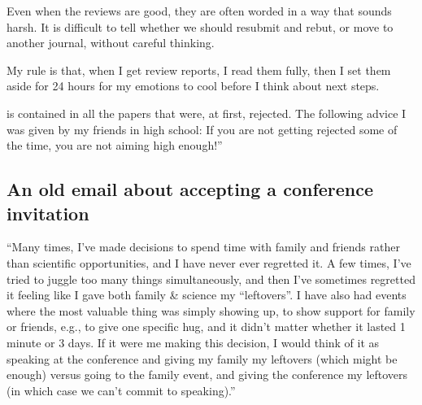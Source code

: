 \documentclass[letterpaper,10pt,english]{sphinxmanual}
\begin{document}
\sphinxAtStartPar
Even when the reviews are good, they are often worded in a way that sounds harsh. It is difficult to tell whether we should resubmit and rebut, or move to another journal, without careful thinking.

\sphinxAtStartPar
My rule is that, when I get review reports, I read them fully, then I set them aside for 24 hours for my emotions to cool before I think about next steps.

\sphinxAtStartPar
{} is contained in all the papers that were, at first, rejected. The following advice I was given by my friends in high school: If you are not getting rejected some of the time, you are not aiming high enough!”


\subsection{An old e\sphinxhyphen{}mail about accepting a conference invitation}
\label{\detokenize{OldEmails:an-old-e-mail-about-accepting-a-conference-invitation}}
\sphinxAtStartPar
“Many times, I’ve made decisions to spend time with family and friends rather than scientific opportunities, and I have never ever regretted it. A few times, I’ve tried to juggle too many things simultaneously, and then I’ve sometimes regretted it \textendash{} feeling like I gave both family \& science my “leftovers”. I have also had events where the most valuable thing was simply showing up, to show support for family or friends, e.g., to give one specific hug, and it didn’t matter whether it lasted 1 minute or 3 days. If it were me making this decision, I would think of it as speaking at the conference and giving my family my leftovers (which might be enough) versus going to the family event, and giving the conference my leftovers (in which case we can’t commit to speaking).”
\end{document}
